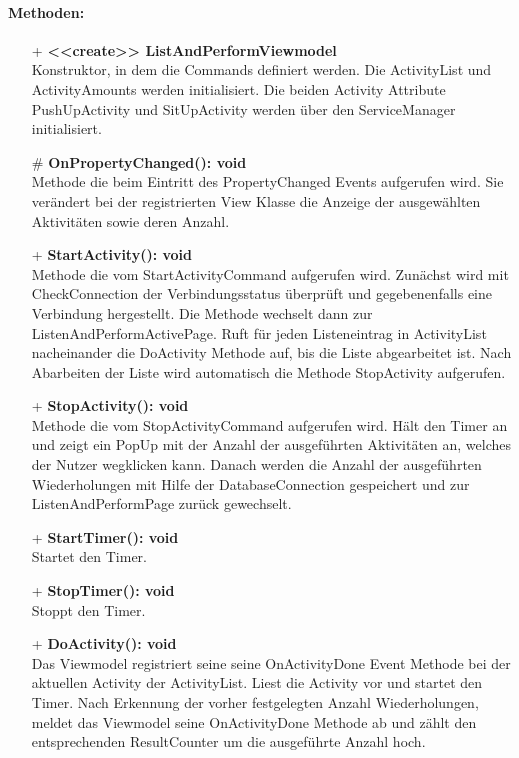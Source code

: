 \documentclass[a4paper,12pt]{article}
\begin{document}
\paragraph{Methoden:}
\begin{itemize}
	\item[+] \textbf{<<create>> ListAndPerformViewmodel} \\ Konstruktor, in dem die Commands definiert werden. Die ActivityList und ActivityAmounts werden initialisiert. Die beiden Activity Attribute PushUpActivity und SitUpActivity werden über den ServiceManager initialisiert.
	\item[\#] \textbf{OnPropertyChanged(): void} \\ Methode die beim Eintritt des PropertyChanged Events aufgerufen wird. Sie verändert bei der registrierten View Klasse die Anzeige der ausgewählten Aktivitäten sowie deren Anzahl. 
	\item[+] \textbf{StartActivity(): void} \\ Methode die vom StartActivityCommand aufgerufen wird. Zunächst wird mit CheckConnection der Verbindungsstatus überprüft und gegebenenfalls eine Verbindung hergestellt. Die Methode wechselt dann zur ListenAndPerformActivePage. Ruft für jeden Listeneintrag in ActivityList nacheinander die DoActivity Methode auf, bis die Liste abgearbeitet ist. Nach Abarbeiten der Liste wird automatisch die Methode StopActivity aufgerufen.
	\item[+] \textbf{StopActivity(): void} \\ Methode die vom StopActivityCommand aufgerufen wird. Hält den Timer an und zeigt ein PopUp mit der Anzahl der ausgeführten Aktivitäten an, welches der Nutzer wegklicken kann. Danach werden die Anzahl der ausgeführten Wiederholungen mit Hilfe der DatabaseConnection gespeichert und zur ListenAndPerformPage zurück gewechselt. 
	\item[+] \textbf{StartTimer(): void} \\ Startet den Timer. 
	\item[+] \textbf{StopTimer(): void} \\ Stoppt den Timer. 
	\item[+] \textbf{DoActivity(): void} \\ Das Viewmodel registriert seine seine OnActivityDone Event Methode bei der aktuellen Activity der ActivityList. Liest die Activity vor und startet den Timer. Nach Erkennung der vorher festgelegten Anzahl Wiederholungen, meldet das Viewmodel seine OnActivityDone Methode ab und zählt den entsprechenden ResultCounter um die ausgeführte Anzahl hoch. 

\end{itemize}
\end{document}
